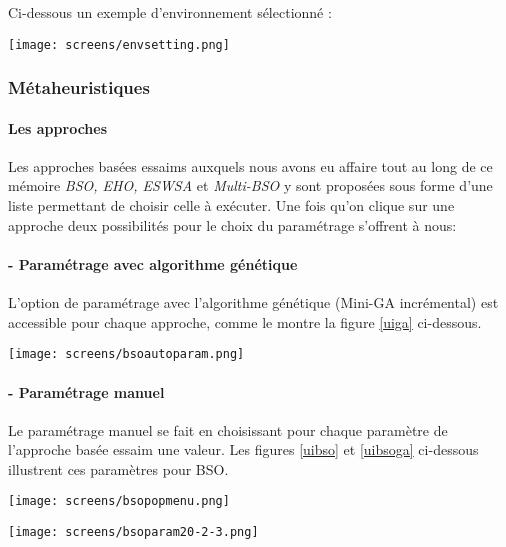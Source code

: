 	Ci-dessous un exemple d'environnement sélectionné :
	\begin{center}	  
		\captionsetup{width=1\linewidth}
		\texttt{[image: screens/envsetting.png]}%
		\vspace{-0.1 cm}
		\label{uienvsetting}%
	\end{center}
	
	\subsubsection{Métaheuristiques}
	
	\paragraph{Les approches}
	Les approches basées essaims auxquels nous avons eu affaire tout au long de ce mémoire \textit{BSO, EHO, ESWSA} et \textit{Multi-BSO} y sont proposées sous forme d'une liste permettant de choisir celle à exécuter.
	Une fois qu'on clique sur une approche deux possibilités pour le choix du paramétrage s'offrent à nous:
	
	
	\paragraph{- Paramétrage avec algorithme génétique}
	L'option de paramétrage avec l'algorithme génétique (Mini-GA incrémental) est accessible pour chaque approche, comme le montre la figure \ref{uiga} ci-dessous.
	
	\begin{center}	  
		\captionsetup{width=1\linewidth}
		\texttt{[image: screens/bsoautoparam.png]}%
		\vspace{-0.1 cm}
		\label{uiga}%
	\end{center}
	
	\paragraph{- Paramétrage manuel}
	Le paramétrage manuel se fait en choisissant pour chaque paramètre de l'approche basée essaim une valeur.
	Les figures \ref{uibso} et \ref{uibsoga} ci-dessous illustrent ces paramètres pour BSO.
	
	\begin{minipage}{0.5\textwidth}
		\centering
		\texttt{[image: screens/bsopopmenu.png]}%
		\vspace{-0.1 cm}
		\label{uibso}%
	\end{minipage}%
	\begin{minipage}{0.5\textwidth}
		\centering	  
		\captionsetup{width=0.6\linewidth}
		\texttt{[image: screens/bsoparam20-2-3.png]}%
		\vspace{-0.1 cm}
		\label{uibsoga}%
	\end{minipage}
	
